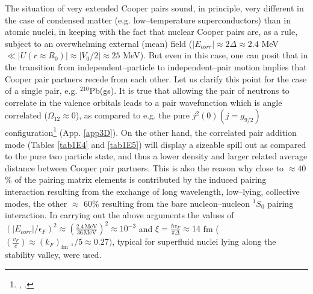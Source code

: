 The situation of very extended Cooper pairs sound, in principle, very different in the case of condensed matter (e.g. low--temperature superconductors) than in atomic nuclei, in keeping with the fact that nuclear Cooper pairs are, as a rule, subject to an overwhelming external (mean) field ($|E_{corr}|\approx 2\Delta\approx2.4$ MeV $\ll |U(r\approx R_0)|\approx |V_0/2|\approx 25 $ MeV). But even in this case, one can posit that in the transition from independent--particle to independent--pair motion implies that Cooper pair partners recede from each other. Let us clarify this point for the case of a single pair, e.g. $^{210}$Pb(gs). It is true that allowing the pair of neutrons to correlate in the valence orbitals leads to a pair wavefunction which is angle correlated ($\Omega_{12}\approx 0$), as compared to e.g. the pure $j^2(0)(j=g_{9/2})$ configuration\footnote{\cite{Bertsch:67}, \cite{Ferreira:84,Matsuo:13}.} (App. \ref{app3D}). On the other hand, the correlated pair addition mode (Tables \ref{tab1E4} and \ref{tab1E5}) will display a sizeable spill out as compared to the pure two particle state, and thus a lower density and larger related average distance between Cooper pair partners. This is also the reason why close to $\approx 40$\% of the pairing matrix elements is contributed by the induced pairing interaction resulting from the exchange of long wavelength, low--lying, collective modes, the other $\approx$ 60\% resulting from the bare nucleon--nucleon $^1S_0$ pairing interaction. In carrying out the above arguments the values of $(|E_{corr}|/\epsilon_F)^2\approx \left(\frac{2.4 \,\text{MeV}}{36\,\text{MeV}}\right)^2\approx 10^{-3}$ and $\xi=\frac{\hbar v_F}{\pi\Delta}\approx 14$ fm ($(\frac{v_F}{c})\approx (k_F)_{\text{fm}^{-1}}/5\approx 0.27)$, typical for superfluid nuclei lying along the stability valley, were used.


